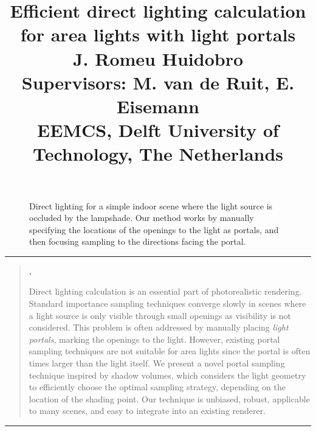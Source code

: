 \documentclass[]{article}
\title{%
  \vspace{-2cm}
  \huge \textbf{Efficient direct lighting calculation for area lights with light portals}\\
  \vspace{0.4cm}
  \Large J. Romeu Huidobro\\
  \vspace{0.3cm}
  \large Supervisors:\; M. van de Ruit, E. Eisemann\\
  \vspace{0.3cm}
  EEMCS, Delft University of Technology, The Netherlands
  \vspace{-1.3cm}
}
\author{}
\date{}
\renewenvironment{abstract}
{
\noindent \rule{\linewidth}{.5pt}
\begin{quote}
\par{\bfseries \abstractname.}
}
{
\end{quote}
\medskip\noindent \rule{\linewidth}{.5pt}
}
\begin{document}
\newcommand{\from}[0]{\leftarrow}

\maketitle

\begin{figure*}[ht]
    \centering
    \def\svgwidth{\textwidth}
    
    \caption{Direct lighting for a simple indoor scene where the light source is occluded by the lampshade. Our method works by manually specifying the locations of the openings to the light as portals, and then focusing sampling to the directions facing the portal.}
    \label{fig:teaser}
\end{figure*}


\begin{abstract}
  Direct lighting calculation is an essential part of photorealistic rendering. Standard importance sampling techniques converge slowly in scenes where a light source is only visible through small openings as visibility is not considered. This problem is often addressed by manually placing \emph{light portals}, marking the openings to the light. However, existing portal sampling techniques are not suitable for area lights since the portal is often times larger than the light itself. We present a novel portal sampling technique inspired by shadow volumes, which considers the light geometry to efficiently choose the optimal sampling strategy, depending on the location of the shading point. Our technique is unbiased, robust, applicable to many scenes, and easy to integrate into an existing renderer.
\end{abstract}

\begin{multicols*}{2}
 









\printbibliography[heading=bibintoc, title={References}]

\end{multicols*}
\end{document}

